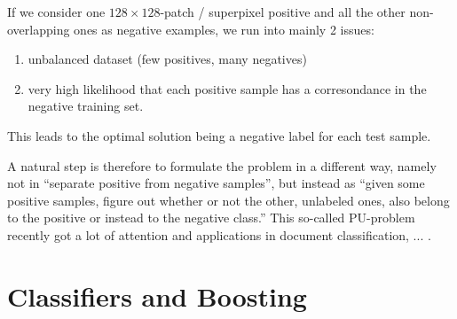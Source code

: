 If we consider one $128 \times 128$-patch / superpixel positive and all the other non-overlapping ones as negative examples, we run into mainly 2 issues: 
\begin{enumerate}
 \item unbalanced dataset (few positives, many negatives)
 \item very high likelihood that each positive sample has a corresondance in the negative training set.
\end{enumerate}
This leads to the optimal solution being a negative label for each test sample.

A natural step is therefore to formulate the problem in a different way, namely not in ``separate positive from negative samples'', but instead as ``given some positive samples, figure out whether or not the other, unlabeled ones, also belong to the positive or instead to the negative class.'' 
This so-called PU-problem recently got a lot of attention and applications in document classification, ... .


\section{Classifiers and Boosting}

